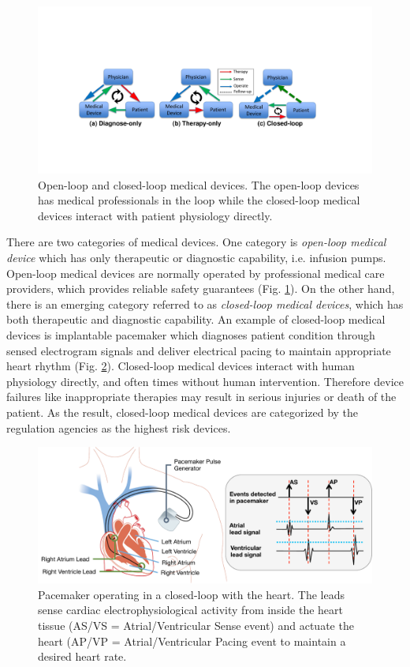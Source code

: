 \documentclass[a4paper]{article}
\begin{document}
\begin{figure}[t]
	\centering
	\includegraphics[scale=0.35]{figs/closed-loop.pdf}
	\caption{\small Open-loop and closed-loop medical devices. The open-loop devices has medical professionals in the loop while the closed-loop medical devices interact with patient physiology directly.}
	\label{fig:closed-loop}
\end{figure}

There are two categories of medical devices. 
One category is \emph{open-loop medical device} which has only therapeutic or diagnostic capability, i.e. infusion pumps. 
Open-loop medical devices are normally operated by professional medical care providers, which provides reliable safety guarantees (Fig. \ref{fig:closed-loop}).
On the other hand, there is an emerging category referred to as \emph{closed-loop medical devices}, which has both therapeutic and diagnostic capability.
An example of closed-loop medical devices is implantable pacemaker which diagnoses patient condition through sensed electrogram signals and deliver electrical pacing to maintain appropriate heart rhythm (Fig. \ref{fig:pacemaker}). 
Closed-loop medical devices interact with human physiology directly, and often times without human intervention.
Therefore device failures like inappropriate therapies may result in serious injuries or death of the patient.
As the result, closed-loop medical devices are categorized by the regulation agencies as the highest risk devices.
\begin{figure}[b]
	\centering
	\includegraphics[scale=0.35]{figs/fig1pacemaker.pdf}
	\caption{\small Pacemaker operating in a closed-loop with the heart. The leads sense cardiac electrophysiological activity from inside the heart tissue (AS/VS = Atrial/Ventricular Sense event) and actuate the heart (AP/VP = Atrial/Ventricular Pacing event to maintain a desired heart rate.}
	\label{fig:pacemaker}
\end{figure}
\end{document}
